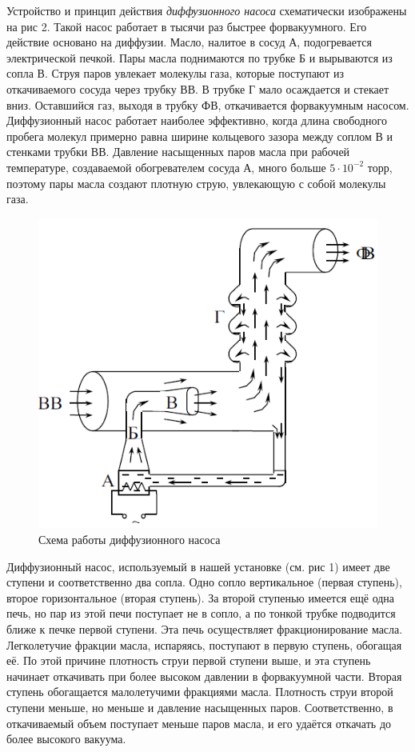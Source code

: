 \documentclass[12pt]{article}
\begin{document}
Устройство и принцип действия \textit{диффузионного насоса} схематически изображены на рис 2. Такой насос работает в тысячи раз быстрее форвакуумного. Его действие основано на диффузии. Масло, налитое в сосуд А, подогревается электрической печкой. Пары масла поднимаются по трубке Б и вырываются из сопла В. Струя паров увлекает молекулы газа, которые поступают из откачиваемого сосуда через трубку ВВ. В трубке Г мало осаждается и стекает вниз. Оставшийся газ, выходя в трубку ФВ, откачивается форвакуумным насосом. \\
Диффузионный насос работает наиболее эффективно, когда длина свободного пробега молекул примерно равна ширине кольцевого зазора между соплом В и стенками трубки ВВ. Давление насыщенных паров масла при рабочей температуре, создаваемой обогревателем сосуда А, много больше $5\cdot 10^{-2}$ торр, поэтому пары масла создают плотную струю, увлекающую с собой молекулы газа.
\begin{figure}[!h]
	\centering
	\includegraphics[width=0.4\linewidth]{Устройство вв насоса.PNG}
	\caption[]{Схема работы диффузионного насоса}
	\label{fig:Схема ВВ насоса}
\end{figure}
 Диффузионный насос, используемый в нашей установке (см. рис 1) имеет две ступени и соответственно два сопла. Одно сопло вертикальное (первая ступень), второе горизонтальное (вторая ступень). За второй ступенью имеется ещё одна печь, но пар из этой печи поступает не в сопло, а по тонкой трубке подводится ближе к печке первой ступени. Эта печь осуществляет фракционирование масла. Легколетучие фракции масла, испаряясь, поступают в первую ступень, обогащая её. По этой причине плотность струи первой ступени выше, и эта ступень начинает откачивать при более высоком давлении в форвакуумной части. Вторая ступень обогащается малолетучими фракциями масла. Плотность струи второй ступени меньше, но меньше и давление насыщенных паров. Соответственно, в откачиваемый объем поступает меньше паров масла, и его удаётся откачать до более высокого вакуума.  \\
\end{document}
